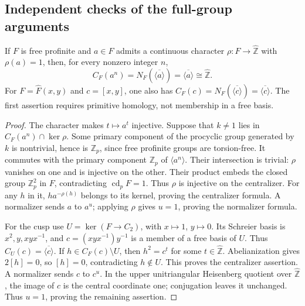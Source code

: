 \subsection{Independent checks of the full-group arguments}

If $F$ is free profinite and $a\in F$ admits a continuous
character $\rho:F\to\widehat{\mathbb Z}$ with $\rho(a)=1$,
then, for every nonzero integer $n$,
\[
 C_F(a^n)=N_F(\overline{\langle a\rangle})
       =\overline{\langle a\rangle}\cong\widehat{\mathbb Z}.
                                                               \tag{C.5.1}
\]
For $F=\widehat F(x,y)$ and $c=[x,y]$, one also has
$C_F(c)=N_F(\overline{\langle c\rangle})=\overline{\langle c\rangle}$.
The first assertion requires primitive homology, not membership
in a free basis.

\begin{proof}
The character makes $t\mapsto a^t$ injective.  Suppose that
$k\ne1$ lies in $C_F(a^n)\cap\ker\rho$.  Some primary
component of the procyclic group generated by $k$ is
nontrivial, hence is $\mathbb Z_p$, since free profinite
groups are torsion-free.  It commutes with the primary
component $\mathbb Z_p$ of $\langle a^n\rangle$.  Their
intersection is trivial: $\rho$ vanishes on one and is
injective on the other.  Their product embeds the closed
group $\mathbb Z_p^2$ in $F$, contradicting
$\operatorname{cd}_pF=1$.  Thus $\rho$ is injective on
the centralizer.  For any $h$ in it,
$ha^{-\rho(h)}$ belongs to its kernel, proving the
centralizer formula.  A normalizer sends $a$ to $a^u$;
applying $\rho$ gives $u=1$, proving the normalizer formula.

For the cusp use $U=\ker(F\to C_2)$, with $x\mapsto1$,
$y\mapsto0$.  Its Schreier basis is $x^2,y,xyx^{-1}$,
and $c=(xyx^{-1})y^{-1}$ is a member of a free basis of
$U$.  Thus $C_U(c)=\overline{\langle c\rangle}$.  If
$h\in C_F(c)\setminus U$, then $h^2=c^t$ for some
$t\in\widehat{\mathbb Z}$.  Abelianization gives $2[h]=0$,
so $[h]=0$, contradicting $h\notin U$.  This proves
the centralizer assertion.  A normalizer sends $c$ to
$c^u$.  In the upper unitriangular Heisenberg quotient
over $\widehat{\mathbb Z}$, the image of $c$ is the
central coordinate one; conjugation leaves it unchanged.
Thus $u=1$, proving the remaining assertion.
\end{proof}

